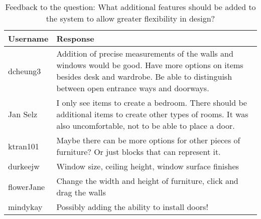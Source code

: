 \begin{table}[h]
\centering

\begin{tabular}{|p{}|p{}|}
\hline
\rowcolor[HTML]{EFEFEF} 
Username   & Response                                                                                                                                                                                       \\ \hline
dcheung3   & Addition of precise measurements of the walls and windows would be good. Have more options on items besides desk and wardrobe. Be able to distinguish between open entrance ways and doorways. \\ \hline
Jan Selz   & I only see items to create a bedroom.  There should be additional items to create other types of rooms.  It was also uncomfortable, not to be able to place a door.                            \\ \hline
ktran101   & Maybe there can be more options for other pieces of furniture? Or just blocks that can represent it.                                                                                           \\ \hline
durkeejw   & Window size, ceiling height, window surface finishes                                                                                                                                           \\ \hline
flowerJane & Change the width and height of furniture, click and drag the walls                                                                                                                             \\ \hline
mindykay   & Possibly adding the ability to install doors!                                                                                                                                                  \\ \hline
\end{tabular}
\caption{Feedback to the question: What additional features should be added to the system to allow greater flexibility in design?}
\label{fig:features}
\end{table}

